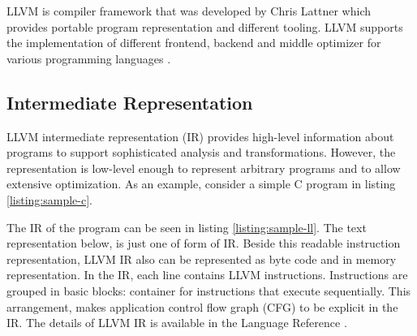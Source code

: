 LLVM is compiler framework that was developed by Chris Lattner which provides portable program representation and different tooling. LLVM supports the implementation of different frontend, backend and middle optimizer for various programming languages \cite{lattnerLLVMCompilationFramework2004a}. 

\subsection{Intermediate Representation}

LLVM intermediate representation (IR) provides high-level information about programs to support sophisticated analysis and transformations. However, the representation is low-level enough to represent arbitrary programs and to allow extensive optimization. As an example, consider a simple C program in listing \ref{listing:sample-c}.


The IR of the program can be seen in listing \ref{listing:sample-ll}. The text representation below, is just one of form of IR. Beside this readable instruction representation, LLVM IR also can be represented as byte code and in memory representation. In the IR, each line contains LLVM instructions. Instructions are grouped in basic blocks: container for instructions that execute sequentially. This arrangement, makes application control flow graph (CFG) to be explicit in the IR. The details of LLVM IR is available in the Language Reference \cite{LLVMLanguageReferencea}.



